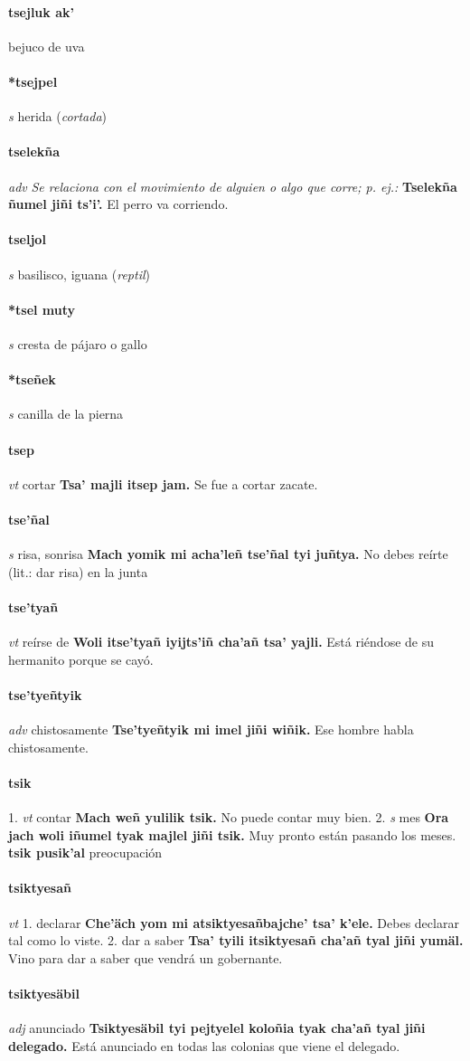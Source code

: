 \documentclass{scrbook}
\newcommand{\entry}[1]{\paragraph{#1}}
\newcommand{\onedefinition}[1]{#1.}
\newcommand{\nontranslationdef}[1]{\textit{#1}}
\newcommand{\partofspeech}[1]{\textit{#1}}
\newcommand{\spanishtranslation}[1]{#1}
\newcommand{\clarification}[1]{(\textit{#1})}
\newcommand{\cholexample}[1]{\textbf{#1}}
\newcommand{\exampletranslation}[1]{#1}
\newcommand{\secondaryentry}[1]{\\\textbf{#1}}
\newcommand{\secondtranslation}[1]{#1}
\begin{document}
\begin{multicols}{2}
\entry{tsejluk ak'}
\spanishtranslation{bejuco de uva}

\entry{*tsejpel}
\partofspeech{s}
\spanishtranslation{herida}
\clarification{cortada}

\entry{tselekña}
\partofspeech{adv}
\nontranslationdef{Se relaciona con el movimiento de alguien o algo que corre; p. ej.:}
\cholexample{Tselekña ñumel jiñi ts'i'.}
\exampletranslation{El perro va corriendo.}

\entry{tseljol}
\partofspeech{s}
\spanishtranslation{basilisco, iguana}
\clarification{reptil}

\entry{*tsel muty}
\partofspeech{s}
\spanishtranslation{cresta de pájaro o gallo}

\entry{*tseñek}
\partofspeech{s}
\spanishtranslation{canilla de la pierna}

\entry{tsep}
\partofspeech{vt}
\spanishtranslation{cortar}
\cholexample{Tsa' majli itsep jam.}
\exampletranslation{Se fue a cortar zacate.}

\entry{tse'ñal}
\partofspeech{s}
\spanishtranslation{risa, sonrisa}
\cholexample{Mach yomik mi acha'leñ tse'ñal tyi juñtya.}
\exampletranslation{No debes reírte (lit.: dar risa) en la junta}

\entry{tse'tyañ}
\partofspeech{vt}
\spanishtranslation{reírse de}
\cholexample{Woli itse'tyañ iyijts'iñ cha'añ tsa' yajli.}
\exampletranslation{Está riéndose de su hermanito porque se cayó.}

\entry{tse'tyeñtyik}
\partofspeech{adv}
\spanishtranslation{chistosamente}
\cholexample{Tse'tyeñtyik mi imel jiñi wiñik.}
\exampletranslation{Ese hombre habla chistosamente.}

\entry{tsik}
\onedefinition{1}
\partofspeech{vt}
\spanishtranslation{contar}
\cholexample{Mach weñ yulilik tsik.}
\exampletranslation{No puede contar muy bien.}
\onedefinition{2}
\partofspeech{s}
\spanishtranslation{mes}
\cholexample{Ora jach woli iñumel tyak majlel jiñi tsik.}
\exampletranslation{Muy pronto están pasando los meses.}
\secondaryentry{tsik pusik'al}
\secondtranslation{preocupación}

\entry{tsiktyesañ}
\partofspeech{vt}
\onedefinition{1}
\spanishtranslation{declarar}
\cholexample{Che'äch yom mi atsiktyesañbajche' tsa' k'ele.}
\exampletranslation{Debes declarar tal como lo viste.}
\onedefinition{2}
\spanishtranslation{dar a saber}
\cholexample{Tsa' tyili itsiktyesañ cha'añ tyal jiñi yumäl.}
\exampletranslation{Vino para dar a saber que vendrá un gobernante.}

\entry{tsiktyesäbil}
\partofspeech{adj}
\spanishtranslation{anunciado}
\cholexample{Tsiktyesäbil tyi pejtyelel koloñia tyak cha'añ tyal jiñi delegado.}
\exampletranslation{Está anunciado en todas las colonias que viene el delegado.}


\end{multicols}
\end{document}
